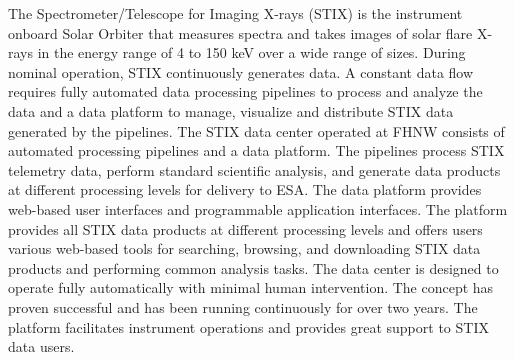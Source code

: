\documentclass[referee]{preaa} %
\begin{document}
  \abstract
   { The Spectrometer/Telescope for Imaging X-rays (STIX) is the instrument onboard Solar Orbiter that measures spectra and takes images of solar flare X-rays in the energy range of 4 to 150 keV over a wide range of sizes.} %
   {During nominal operation, STIX continuously generates data. A constant data flow requires fully automated data processing pipelines to process and analyze the data and a data platform to manage, visualize and distribute STIX data generated by the pipelines.
   }
   {
   The STIX data center operated at FHNW consists of automated processing pipelines and a data platform.  The pipelines process STIX telemetry data, perform standard scientific analysis, and generate data products at different processing levels for delivery to ESA. The data platform provides web-based user interfaces and programmable application interfaces. }
   {
   The platform provides all STIX data products at different processing levels and offers users various web-based tools for searching, browsing, and downloading STIX data products and performing common analysis tasks. The data center is designed to operate fully automatically with minimal human intervention. The concept has proven successful and has been running continuously for over two years. The platform facilitates instrument operations and provides great support to STIX data users.}
 {}
   \maketitle

\end{document}
